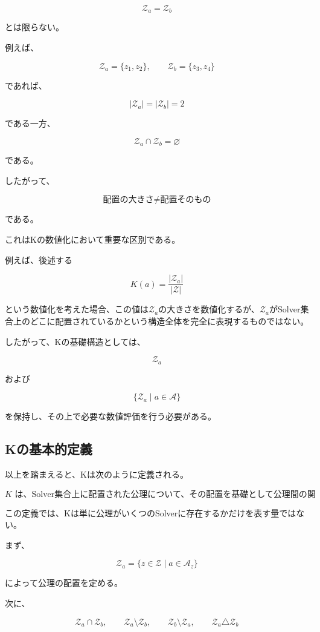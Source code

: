 \[
\mathcal{Z}_a = \mathcal{Z}_b
\]

とは限らない。

例えば、

\[
\mathcal{Z}_a=\{z_1,z_2\},
\qquad
\mathcal{Z}_b=\{z_3,z_4\}
\]

であれば、

\[
|\mathcal{Z}_a| = |\mathcal{Z}_b| = 2
\]

である一方、

\[
\mathcal{Z}_a\cap\mathcal{Z}_b = \varnothing
\]

である。

したがって、

\[
\boxed{
\text{配置の大きさ}
\neq
\text{配置そのもの}
}
\]

である。

これはKの数値化において重要な区別である。

例えば、後述する

\[
K(a)=\frac{|\mathcal{Z}_a|}{|\mathcal{Z}|}
\]

という数値化を考えた場合、この値は$\mathcal{Z}_a$の大きさを数値化するが、$\mathcal{Z}_a$がSolver集合上のどこに配置されているかという構造全体を完全に表現するものではない。

したがって、Kの基礎構造としては、

\[
\mathcal{Z}_a
\]

および

\[
\{\mathcal{Z}_a\mid a\in\mathcal{A}\}
\]

を保持し、その上で必要な数値評価を行う必要がある。

\subsection{Kの基本的定義}

以上を踏まえると、Kは次のように定義される。

\[
\boxed{
K\text{ は、Solver集合上に配置された公理について、その配置を基礎として公理間の関係および分離の構造を記述し、それを数値化する量である。}
}
\]

この定義では、Kは単に公理がいくつのSolverに存在するかだけを表す量ではない。

まず、

\[
\mathcal{Z}_a = \{z\in\mathcal{Z}\mid a\in\mathcal{A}_z\}
\]

によって公理の配置を定める。

次に、

\[
\mathcal{Z}_a\cap\mathcal{Z}_b,
\qquad
\mathcal{Z}_a\setminus\mathcal{Z}_b,
\qquad
\mathcal{Z}_b\setminus\mathcal{Z}_a,
\qquad
\mathcal{Z}_a\triangle\mathcal{Z}_b
\]

